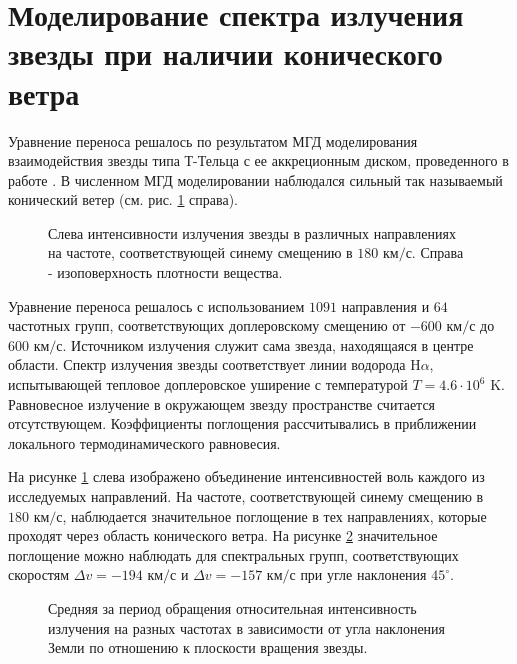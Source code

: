 \section{Моделирование спектра излучения звезды при наличии конического ветра}
Уравнение переноса решалось по результатом МГД моделирования взаимодействия звезды типа Т-Тельца с ее аккреционным диском, проведенного в работе \cite{rom_2009}. В численном МГД моделировании наблюдался сильный так называемый конический ветер (см. рис. \ref{fig:15} справа). 
\begin{figure}[ht!]
\caption{Слева интенсивности излучения звезды в различных направлениях на частоте, соответствующей синему смещению в $180 \text{ км/с}$. Справа - изоповерхность плотности вещества.}
\label{fig:15}
\end{figure}

Уравнение переноса решалось с использованием $1091$ направления и $64$ частотных групп, соответствующих доплеровскому смещению от $-600 \text{ км/с}$ до $600 \text{ км/с}$. Источником излучения служит сама звезда, находящаяся в центре области. Спектр излучения звезды соответствует линии водорода $\text{H}\alpha$, испытывающей тепловое доплеровское уширение с температурой $T = 4.6 \cdot 10^6 \text{ K}$. Равновесное излучение в окружающем звезду пространстве считается отсутствующем. Коэффициенты поглощения рассчитывались в приближении локального термодинамического равновесия. 

 На рисунке \ref{fig:15} слева изображено объединение интенсивностей воль каждого из исследуемых направлений. На частоте, соответствующей синему смещению в $180 \text{ км/с}$, наблюдается значительное поглощение в тех направлениях, которые проходят через область конического ветра. На рисунке \ref{fig:16} значительное поглощение можно наблюдать для спектральных групп, соответствующих скоростям $\Delta v = -194 \text{ км/с}$ и $\Delta v = -157 \text{ км/с}$ при угле наклонения $45^\circ$.
 
 \begin{figure}[ht!]
 \caption{Средняя за период обращения относительная интенсивность излучения на разных частотах в зависимости от угла наклонения Земли по отношению к плоскости вращения звезды.}
 \label{fig:16}
 \end{figure} 
